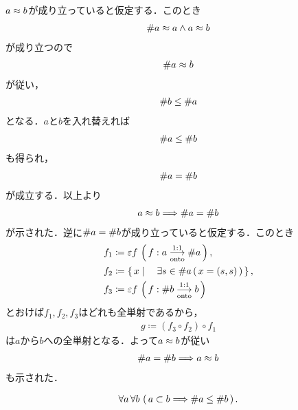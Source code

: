 	\begin{prf}
		$a \approx b$が成り立っていると仮定する．このとき
		\begin{align}
			\# a \approx a \wedge a \approx b
		\end{align}
		が成り立つので
		\begin{align}
			\# a \approx b
		\end{align}
		が従い，
		\begin{align}
			\# b \leq \# a
		\end{align}
		となる．$a$と$b$を入れ替えれば
		\begin{align}
			\# a \leq \# b
		\end{align}
		も得られ，
		\begin{align}
			\# a = \# b
		\end{align}
		が成立する．以上より
		\begin{align}
			a \approx b \Longrightarrow \# a = \# b
		\end{align}
		が示された．逆に$\# a = \# b$が成り立っていると仮定する．このとき
		\begin{align}
			f_1 &\coloneqq \varepsilon f\, \left(\, f:a \underset{\mathrm{onto}}{\overset{\mathrm{1:1}}{\longrightarrow}} \# a\, \right), \\
			f_2 &\coloneqq \left\{\, x \mid \quad \exists s \in \# a\, (\,x = (s,s)\, )\, \right\}, \\
			f_3 &\coloneqq \varepsilon f\, \left(\, f:\# b \underset{\mathrm{onto}}{\overset{\mathrm{1:1}}{\longrightarrow}} b\, \right)
		\end{align}
		とおけば$f_1,f_2,f_3$はどれも全単射であるから，
		\begin{align}
			g \coloneqq (f_3 \circ f_2) \circ f_1
		\end{align}
		は$a$から$b$への全単射となる．よって$a \approx b$が従い
		\begin{align}
			\# a = \# b \Longrightarrow a \approx b
		\end{align}
		も示された．
		\QED
	\end{prf}
	
	\begin{screen}
		\begin{thm}[集合が大きい方が濃度も大きい]
		\label{thm:cardinal_of_bigger_set_is_bigger}
			\begin{align}
				\forall a\, \forall b\, \left(\, a \subset b \Longrightarrow \# a \leq \# b\, \right).
			\end{align}
		\end{thm}
	\end{screen}
	
